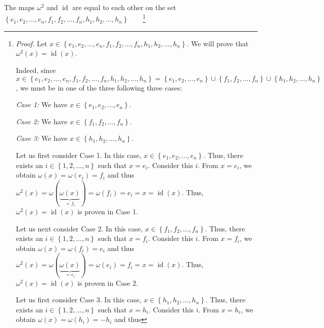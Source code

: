 \documentclass[etingof-lie.tex]{subfiles}
\begin{document}
\begin{verlong}
The maps $\omega^{2}$ and $\operatorname*{id}$ are equal to each other on the
set $\left\{  e_{1},e_{2},...,e_{n},f_{1},f_{2},...,f_{n},h_{1},h_{2}%
,...,h_{n}\right\}  $\ \ \ \ \footnote{\textit{Proof.} Let $x\in\left\{
e_{1},e_{2},...,e_{n},f_{1},f_{2},...,f_{n},h_{1},h_{2},...,h_{n}\right\}  $.
We will prove that $\omega^{2}\left(  x\right)  =\operatorname*{id}\left(
x\right)  $.
\par
Indeed, since $x\in\left\{  e_{1},e_{2},...,e_{n},f_{1},f_{2},...,f_{n}%
,h_{1},h_{2},...,h_{n}\right\}  =\left\{  e_{1},e_{2},...,e_{n}\right\}
\cup\left\{  f_{1},f_{2},...,f_{n}\right\}  \cup\left\{  h_{1},h_{2}%
,...,h_{n}\right\}  $, we must be in one of the three following three cases:
\par
\textit{Case 1:} We have $x\in\left\{  e_{1},e_{2},...,e_{n}\right\}  $.
\par
\textit{Case 2:} We have $x\in\left\{  f_{1},f_{2},...,f_{n}\right\}  $.
\par
\textit{Case 3:} We have $x\in\left\{  h_{1},h_{2},...,h_{n}\right\}  $.
\par
Let us first consider Case 1. In this case, $x\in\left\{  e_{1},e_{2}%
,...,e_{n}\right\}  $. Thus, there exists an $i\in\left\{  1,2,...,n\right\}
$ such that $x=e_{i}$. Consider this $i$. From $x=e_{i}$, we obtain
$\omega\left(  x\right)  =\omega\left(  e_{i}\right)  =f_{i}$ and thus
$\omega^{2}\left(  x\right)  =\omega\left(  \underbrace{\omega\left(
x\right)  }_{=f_{i}}\right)  =\omega\left(  f_{i}\right)  =e_{i}%
=x=\operatorname*{id}\left(  x\right)  $. Thus, $\omega^{2}\left(  x\right)
=\operatorname*{id}\left(  x\right)  $ is proven in Case 1.
\par
Let us next consider Case 2. In this case, $x\in\left\{  f_{1},f_{2}%
,...,f_{n}\right\}  $. Thus, there exists an $i\in\left\{  1,2,...,n\right\}
$ such that $x=f_{i}$. Consider this $i$. From $x=f_{i}$, we obtain
$\omega\left(  x\right)  =\omega\left(  f_{i}\right)  =e_{i}$ and thus
$\omega^{2}\left(  x\right)  =\omega\left(  \underbrace{\omega\left(
x\right)  }_{=e_{i}}\right)  =\omega\left(  e_{i}\right)  =f_{i}%
=x=\operatorname*{id}\left(  x\right)  $. Thus, $\omega^{2}\left(  x\right)
=\operatorname*{id}\left(  x\right)  $ is proven in Case 2.
\par
Let us first consider Case 3. In this case, $x\in\left\{  h_{1},h_{2}%
,...,h_{n}\right\}  $. Thus, there exists an $i\in\left\{  1,2,...,n\right\}
$ such that $x=h_{i}$. Consider this $i$. From $x=h_{i}$, we obtain
$\omega\left(  x\right)  =\omega\left(  h_{i}\right)  =-h_{i}$ and thus
}
\end{verlong}
\end{document}
